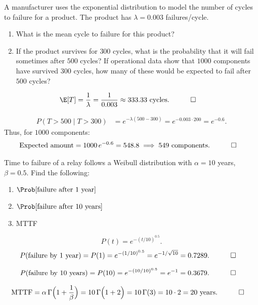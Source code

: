 \begin{hwkProblem}{6}{}

	A manufacturer uses the exponential distribution to model the number of cycles to failure for a product. The product has \( \lambda = 0.003 \) failures/cycle.
	\begin{enumerate}
		\item What is the mean cycle to failure for this product?
		\item If the product survives for \( 300 \) cycles, what is the probability that it will fail sometimes after \( 500 \) cycles? If operational data show that \( 1000 \) components have survived \( 300 \) cycles, how many of these would be expected to fail after \( 500 \) cycles?
	\end{enumerate}

	\hwkSol

	\hwkPart
	\begin{align*}
		\E[T]&=\frac{1}{\lambda}=\frac{1}{0.003}\approx 333.33\ \text{cycles}. \quad \qed
	\end{align*}

	\hwkPart
	\begin{align*}
		P(T>500 \mid T>300)&= e^{-\lambda(500-300)}
		= e^{-0.003\cdot 200}
		= e^{-0.6}.
	\end{align*}
	Thus, for \( 1000 \) components:
	\begin{align*}
		\text{Expected amount} &= 1000\,e^{-0.6} = 548.8 \implies 549 \text{ components}. \quad \qed
	\end{align*}

\end{hwkProblem}

\begin{hwkProblem}{7}{}

	Time to failure of a relay follows a Weibull distribution with \( \alpha = 10 \) years, \( \beta = 0.5 \). Find the following:
	\begin{enumerate}
		\item \( \Prob[\text{failure after 1 year}] \)
		\item \( \Prob[\text{failure after 10 years}] \)
		\item MTTF
	\end{enumerate}

	\hwkSol

	\[
		P(t)= e^{-(t/10)^{0.5}}.
	\]
	\hwkPart
	\begin{align*}
		P(\text{failure by 1 year})
		&= P(1)= e^{-(1/10)^{0.5}}
		= e^{-1/\sqrt{10}}=0.7289. \quad \qed
	\end{align*}

	\hwkPart
	\begin{align*}
		P(\text{failure by 10 years})
		&= P(10)= e^{-(10/10)^{0.5}}
		= e^{-1}=0.3679. \quad \qed
	\end{align*}

	\hwkPart
	\begin{align*}
		\text{MTTF}&= \alpha\,\Gamma\Bigl(1+\frac{1}{\beta}\Bigr)
		= 10\,\Gamma\Bigl(1+2\Bigr)
		= 10\,\Gamma(3)
		= 10\cdot 2=20\ \text{years}. \quad \qed
	\end{align*}
\end{hwkProblem}

